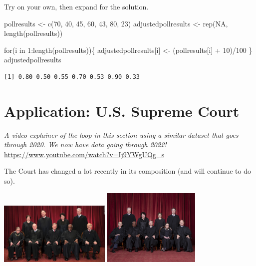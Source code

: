 \documentclass[
  letterpaper,
  DIV=11,
  numbers=noendperiod]{scrreprt}
\newenvironment{Shaded}{\begin{snugshade}}{\end{snugshade}}
\newcommand{\ConstantTok}[1]{\textcolor[rgb]{0.56,0.35,0.01}{#1}}
\newcommand{\ControlFlowTok}[1]{\textcolor[rgb]{0.00,0.23,0.31}{#1}}
\newcommand{\DecValTok}[1]{\textcolor[rgb]{0.68,0.00,0.00}{#1}}
\newcommand{\FunctionTok}[1]{\textcolor[rgb]{0.28,0.35,0.67}{#1}}
\newcommand{\NormalTok}[1]{\textcolor[rgb]{0.00,0.23,0.31}{#1}}
\newcommand{\OtherTok}[1]{\textcolor[rgb]{0.00,0.23,0.31}{#1}}
\newcommand{\SpecialCharTok}[1]{\textcolor[rgb]{0.37,0.37,0.37}{#1}}
\begin{document}
Try on your own, then expand for the solution.

\begin{Shaded}
\begin{Highlighting}[]
\NormalTok{pollresults }\OtherTok{\textless{}{-}} \FunctionTok{c}\NormalTok{(}\DecValTok{70}\NormalTok{, }\DecValTok{40}\NormalTok{, }\DecValTok{45}\NormalTok{, }\DecValTok{60}\NormalTok{, }\DecValTok{43}\NormalTok{, }\DecValTok{80}\NormalTok{, }\DecValTok{23}\NormalTok{)}
\NormalTok{adjustedpollresults }\OtherTok{\textless{}{-}} \FunctionTok{rep}\NormalTok{(}\ConstantTok{NA}\NormalTok{, }\FunctionTok{length}\NormalTok{(pollresults))}

\ControlFlowTok{for}\NormalTok{(i }\ControlFlowTok{in} \DecValTok{1}\SpecialCharTok{:}\FunctionTok{length}\NormalTok{(pollresults))\{}
\NormalTok{  adjustedpollresults[i] }\OtherTok{\textless{}{-}}\NormalTok{ (pollresults[i] }\SpecialCharTok{+} \DecValTok{10}\NormalTok{)}\SpecialCharTok{/}\DecValTok{100} 
\NormalTok{\}}
\NormalTok{adjustedpollresults}
\end{Highlighting}
\end{Shaded}

\begin{verbatim}
[1] 0.80 0.50 0.55 0.70 0.53 0.90 0.33
\end{verbatim}

\hypertarget{application-u.s.-supreme-court}{%
\section{Application: U.S. Supreme
Court}\label{application-u.s.-supreme-court}}

\emph{A video explainer of the loop in this section using a similar
dataset that goes through 2020. We now have data going through 2022!}
\url{https://www.youtube.com/watch?v=Ij9YWgUQg_s}

The Court has changed a lot recently in its composition (and will
continue to do so).

\includegraphics[width=0.4\textwidth,height=\textheight]{images/sccourt6.jpeg}
\includegraphics[width=0.35\textwidth,height=\textheight]{images/sccourt.jpg}
\end{document}
